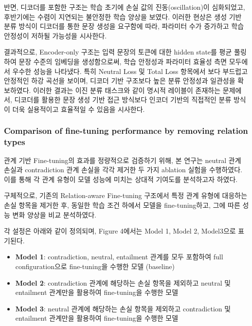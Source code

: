 \documentclass[a4paper,fleqn]{cas-sc}
\begin{document}
    반면, 디코더를 포함한 구조는 학습 초기에 손실 값의 진동(oscillation)이 심화되었고, 후반기에는 수렴이 지연되는 불안정한 학습 양상을 보였다. 이러한 현상은 생성 기반 분류 방식이 디코더를 통한 문장 생성을 요구함에 따라, 파라미터 수가 증가하고 학습 안정성이 저하될 가능성을 시사한다.

    결과적으로, Encoder-only 구조는 입력 문장의 토큰에 대한 hidden state를 평균 풀링하여 문장 수준의 임베딩을 생성함으로써, 학습 안정성과 파라미터 효율성 측면 모두에서 우수한 성능을 나타냈다. 특히 Neutral Loss 및 Total Loss 항목에서 보다 부드럽고 안정적인 하강 곡선을 보이며, 디코더 기반 구조보다 높은 분류 안정성과 일관성을 확보하였다. 이러한 결과는 이진 분류 태스크와 같이 명시적 레이블이 존재하는 문제에서, 디코더를 활용한 문장 생성 기반 접근 방식보다 인코더 기반의 직접적인 분류 방식이 더욱 실용적이고 효율적일 수 있음을 시사한다.

   
\subsubsection{Comparison of fine-tuning performance by removing relation types}
\FloatBarrier

관계 기반 Fine-tuning의 효과를 정량적으로 검증하기 위해, 본 연구는 neutral 관계 손실과 contradiction 관계 손실을 각각 제거한 두 가지 ablation 실험을 수행하였다. 이를 통해 각 관계 유형이 모델 성능에 미치는 상대적 기여도를 분석하고자 하였다.

구체적으로, 기존의 Relation-aware Fine-tuning 구조에서 특정 관계 유형에 대응하는 손실 항목을 제거한 후, 동일한 학습 조건 하에서 모델을 fine-tuning하고, 그에 따른 성능 변화 양상을 비교 분석하였다.

각 설정은 아래와 같이 정의되며, Figure 4에서는 Model 1, Model 2, Model3으로 표기된다.

\begin{itemize}
    \item{\textbf{Model 1}:
    contradiction, neutral, entailment 관계를 모두 포함하여 full configuration으로 fine-tuning을 수행한 모델 (baseline)}
    \item{\textbf{Model 2}:
    contradiction 관계에 해당하는 손실 항목을 제외하고 neutral 및 entailment 관계만을 활용하여 fine-tuning을 수행한 모델}
    \item{\textbf{Model 3}: 
    neutral 관계에 해당하는 손실 항목을 제외하고 contradiction 및 entailment 관계만을 활용하여 fine-tuning을 수행한 모델}
\end{itemize}  
\end{document}
